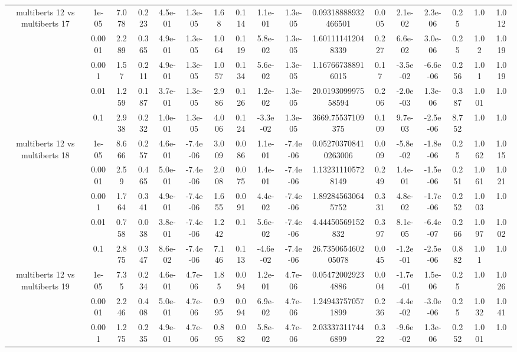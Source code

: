 \begin{tabular}{|c|c|c|c|c|c|c|c|c|c|c|c|c|c|c|c|c|}
\hline
\multirow{5}{*}{multiberts 12 vs multiberts 17} & 1e-05 & 7.078 & 0.223 & 4.5e-01 & 1.3e-05 & 1.68 & 0.114 & 1.1e-01 & 1.3e-05 & 0.09318888932466501 & 0.005 & 2.1e-02 & 2.3e-06 & 0.25 & 1.0 & 1.012 \\
 & 0.0001 & 2.289 & 0.365 & 4.9e-01 & 1.3e-05 & 1.064 & 0.119 & 5.8e-02 & 1.3e-05 & 1.601111412048339 & 0.227 & 6.6e-02 & 3.0e-06 & 0.25 & 1.02 & 1.019 \\
 & 0.001 & 1.57 & 0.211 & 4.9e-01 & 1.3e-05 & 1.057 & 0.134 & 5.6e-02 & 1.3e-05 & 1.167667388916015 & 0.17 & -3.5e-02 & -6.6e-06 & 0.256 & 1.01 & 1.019 \\
 & 0.01 & 1.259 & 0.187 & 3.7e-01 & 1.3e-05 & 2.986 & 0.126 & 1.2e-02 & 1.3e-05 & 20.019309997558594 & 0.206 & -2.0e-03 & 1.3e-06 & 0.387 & 1.001 & 1.0 \\
 & 0.1 & 2.938 & 0.232 & 1.0e-01 & 1.3e-05 & 4.006 & 0.124 & -3.3e-02 & 1.3e-05 & 3669.75537109375 & 0.109 & 9.7e-03 & -2.5e-06 & 8.752 & 1.0 & 1.0 \\
\hline
\multirow{5}{*}{multiberts 12 vs multiberts 18} & 1e-05 & 8.666 & 0.257 & 4.6e-01 & -7.4e-06 & 3.009 & 0.086 & 1.1e-01 & -7.4e-06 & 0.052703708410263006 & 0.009 & -5.8e-02 & -1.8e-06 & 0.25 & 1.062 & 1.015 \\
 & 0.0001 & 2.59 & 0.465 & 5.0e-01 & -7.4e-06 & 2.008 & 0.075 & 1.4e-01 & -7.4e-06 & 1.132311105728149 & 0.249 & 1.4e-01 & -1.5e-06 & 0.251 & 1.061 & 1.021 \\
 & 0.001 & 1.764 & 0.341 & 4.9e-01 & -7.4e-06 & 1.655 & 0.091 & 4.4e-02 & -7.4e-06 & 1.892845630645752 & 0.331 & 4.8e-02 & -1.7e-06 & 0.252 & 1.003 & 1.0 \\
 & 0.01 & 0.758 & 0.038 & 3.8e-01 & -7.4e-06 & 1.242 & 0.1 & 5.6e-02 & -7.4e-06 & 4.44450569152832 & 0.397 & 8.1e-05 & -6.4e-07 & 0.266 & 1.097 & 1.002 \\
 & 0.1 & 2.875 & 0.347 & 8.6e-02 & -7.4e-06 & 7.146 & 0.113 & -4.6e-02 & -7.4e-06 & 26.735065460205078 & 0.045 & -1.2e-01 & -2.5e-06 & 0.882 & 1.01 & 1.0 \\
\hline
\multirow{5}{*}{multiberts 12 vs multiberts 19} & 1e-05 & 7.35 & 0.234 & 4.6e-01 & 4.7e-06 & 1.85 & 0.094 & 1.2e-01 & 4.7e-06 & 0.054720029234886 & 0.004 & -1.7e-01 & 1.5e-06 & 0.25 & 1.0 & 1.026 \\
 & 0.0001 & 2.246 & 0.408 & 5.0e-01 & 4.7e-06 & 0.995 & 0.094 & 6.9e-02 & 4.7e-06 & 1.249437570571899 & 0.236 & -4.4e-02 & -3.0e-06 & 0.25 & 1.032 & 1.041 \\
 & 0.001 & 1.275 & 0.235 & 4.9e-01 & 4.7e-06 & 0.895 & 0.082 & 5.8e-02 & 4.7e-06 & 2.033373117446899 & 0.322 & -9.6e-02 & 1.3e-06 & 0.252 & 1.001 & 1.0 \\

\end{tabular}
